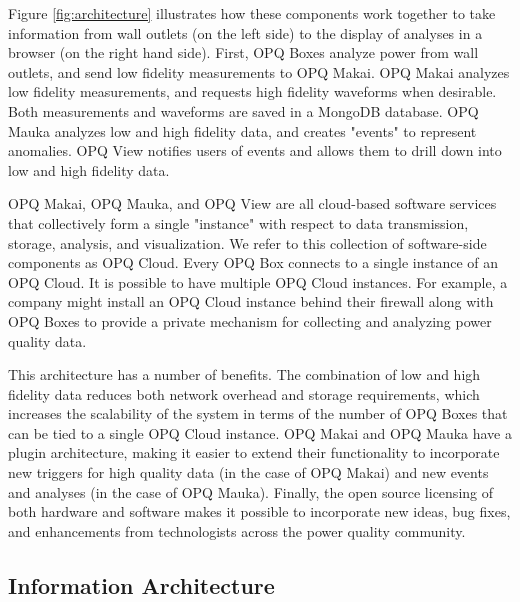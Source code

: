 Figure \ref{fig:architecture} illustrates how these components work together to take information from wall outlets (on the left side) to the display of analyses in a browser (on the right hand side).  First, OPQ Boxes analyze power from wall outlets, and send low fidelity measurements to OPQ Makai. OPQ Makai analyzes low fidelity measurements, and requests high fidelity waveforms when desirable. Both measurements and waveforms are saved in a MongoDB database. OPQ Mauka analyzes low and high fidelity data, and creates "events" to represent anomalies. OPQ View notifies users of events and allows them to drill down into low and high fidelity data.

OPQ Makai, OPQ Mauka, and OPQ View are all cloud-based software services that collectively form a single "instance" with respect to data transmission, storage, analysis, and visualization. We refer to this collection of software-side components as OPQ Cloud. Every OPQ Box connects to a single instance of an OPQ Cloud. It is possible to have multiple OPQ Cloud instances. For example, a company might install an OPQ Cloud instance behind their firewall along with OPQ Boxes to provide a private mechanism for collecting and analyzing power quality data.

This architecture has a number of benefits. The combination of low and high fidelity data reduces both network overhead and storage requirements, which increases the scalability of the system in terms of the number of OPQ Boxes that can be tied to a single OPQ Cloud instance. OPQ Makai and OPQ Mauka have a plugin architecture, making it easier to extend their functionality to incorporate new triggers for high quality data (in the case of OPQ Makai) and new events and analyses (in the case of OPQ Mauka). Finally, the open source licensing of both hardware and software makes it possible to incorporate new ideas, bug fixes, and enhancements from technologists across the power quality community.

\subsection{Information Architecture}

